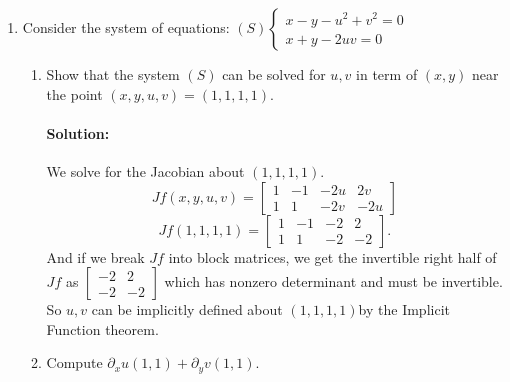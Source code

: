 \documentclass{article}
\begin{document}
\begin{enumerate}
\begin{enumerate}[label= (\alph*)]
\end{enumerate}

\item Consider the system of equations:
$(S) \left\{\begin{array}{l}
x - y - u^2 + v^2 = 0 \\
x + y - 2uv = 0
\end{array}\right.$  
\begin{enumerate}[label= (\alph*)] 
    \item Show that the system $(S)$ can be solved for $u,v$ in term of $(x,y)$ near the point $(x,y,u,v)=(1,1,1,1).$  
        \paragraph{Solution: }We solve for the Jacobian about $(1,1,1,1)$.
         \[ Jf(x,y,u,v)=\begin{bmatrix} 
        1&-1&-2u&2v\\
        1&1&-2v&-2u \end{bmatrix} \]
        \[
        Jf(1,1,1,1)=\begin{bmatrix} 
        1&-1&-2&2\\
        1&1&-2&-2 \end{bmatrix}
        .\] 
        And if we break $Jf$ into block matrices, we get the invertible right half of $Jf$ as $\begin{bmatrix} -2&2\\-2&-2 \end{bmatrix} $ which has nonzero determinant and must be invertible. So $u,v$ can be implicitly defined about $(1,1,1,1)$by the Implicit Function theorem. %
    \item Compute $\partial_x u(1,1)+\partial_y v(1,1)$.


\end{enumerate}
\end{enumerate}
\end{document}
